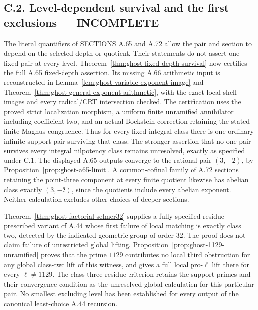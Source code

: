 \subsection*{C.2. Level-dependent survival and the first exclusions --- INCOMPLETE}
\label{task:ghost-c2}
The literal quantifiers of SECTIONS A.65 and A.72 allow the
pair and section to depend on the selected depth or quotient.
Their statements do not assert one fixed pair at every level.
Theorem~\ref{thm:ghost-fixed-depth-survival} now certifies
the full A.65 fixed-depth assertion. Its missing A.66
arithmetic input is reconstructed in
Lemma~\ref{lem:ghost-variable-exponent-image} and
Theorem~\ref{thm:ghost-general-exponent-arithmetic}, with
the exact local shell images and every radical/CRT
intersection checked. The certification uses the proved
strict localization morphism, a uniform finite unramified
annihilator including coefficient two, and an actual
Bockstein correction retaining the stated finite Magnus
congruence. Thus for every fixed integral class there
is one ordinary infinite-support pair surviving that class.
The stronger assertion that no one pair survives every
integral nilpotency class remains unresolved, exactly as
specified under C.1. The displayed A.65 outputs converge
to the rational pair \((3,-2)\), by
Proposition~\ref{prop:ghost-a65-limit}. A common-cofinal family
of A.72 sections retaining the point-three component at every
finite quotient likewise has abelian class exactly
\((3,-2)\), since the quotients include every abelian exponent.
Neither calculation excludes other choices of deeper sections.

Theorem~\ref{thm:ghost-factorial-selmer32} supplies a fully
specified residue-prescribed variant of A.44 whose first
failure of local matching is exactly class two, detected by
the indicated geometric group of order \(32\). The proof
does not claim failure of unrestricted global lifting.
Proposition~\ref{prop:ghost-1129-unramified} proves that
the prime \(1129\) contributes no local third obstruction
for any global class-two lift of this witness, and gives a
full local pro-\(\ell\) lift there for every \(\ell\ne1129\).
The class-three residue criterion retains the support
primes and their convergence condition as the unresolved
global calculation for this particular pair.
No smallest excluding level has been established for every
output of the canonical least-choice A.44 recursion.

